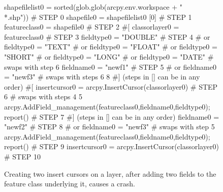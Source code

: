 \begin{figure}
{\scriptsize 
\begin{code}
shapefilelist0 = sorted(glob.glob(arcpy.env.workspace + "\\*.shp"))         \textcolor{black!60}{\# STEP 0}
shapefile0 = shapefilelist0 [0]                                            \textcolor{black!60}{\# STEP 1}
featureclass0 = shapefile0                                                 \textcolor{black!60}{\# STEP 2}
\textcolor{black!60}{\#[}
classorlayer0 = featureclass0                                              \textcolor{black!60}{\# STEP 3}
fieldtype0 = "DOUBLE"                                                      \textcolor{black!60}{\# STEP 4}
\textcolor{black!60}{\#  or fieldtype0 = "TEXT"}
\textcolor{black!60}{\#  or fieldtype0 = "FLOAT"}
\textcolor{black!60}{\#  or fieldtype0 = "SHORT"}
\textcolor{black!60}{\#  or fieldtype0 = "LONG"}
\textcolor{black!60}{\#  or fieldtype0 = "DATE"}
\textcolor{black!60}{\#  swaps with step 6}
fieldname0 = "newf1"                                                       \textcolor{black!60}{\# STEP 5}
\textcolor{black!60}{\#  or fieldname0 = "newf3"}
\textcolor{black!60}{\#  swaps with steps 6 8}
\textcolor{black!60}{\#] (steps in [] can be in any order)}
\textcolor{black!60}{\#[}
insertcursor0 = arcpy.InsertCursor(classorlayer0)                          \textcolor{black!60}{\# STEP 6}
\textcolor{black!60}{\#  swaps with steps 4 5}
arcpy.AddField\_management(featureclass0,fieldname0,fieldtype0); report()   \textcolor{black!60}{\# STEP 7}
\textcolor{black!60}{\#] (steps in [] can be in any order)}
fieldname0 = "newf2"                                                       \textcolor{black!60}{\# STEP 8}
\textcolor{black!60}{\#  or fieldname0 = "newf3"}
\textcolor{black!60}{\#  swaps with step 5}
arcpy.AddField\_management(featureclass0,fieldname0,fieldtype0); report()   \textcolor{black!60}{\# STEP 9}
insertcursor0 = arcpy.InsertCursor(classorlayer0)                          \textcolor{black!60}{\# STEP 10}
\end{code}
}
\caption{Creating two insert cursors on a layer, after adding two fields to the feature class underlying it, causes a crash.}
\label{fault3}
\end{figure}


